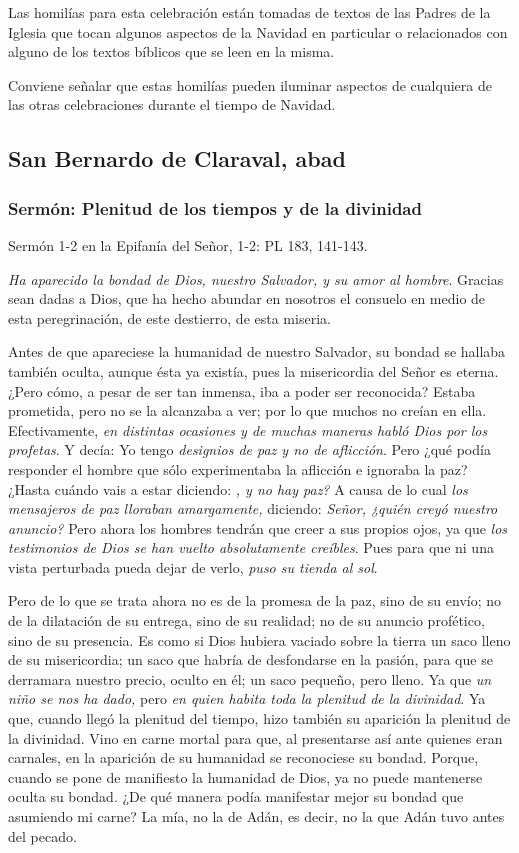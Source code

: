 \begin{body}
\begin{body}
Las homilías para esta celebración están tomadas de textos de las Padres de la Iglesia que tocan algunos aspectos de la Navidad en particular o relacionados con alguno de los textos bíblicos que se leen en la misma.

Conviene señalar que estas homilías pueden iluminar aspectos de cualquiera de las otras celebraciones durante el tiempo de Navidad.

\subsection{San Bernardo de Claraval, abad}

\subsubsection{Sermón: Plenitud de los tiempos y de la divinidad}

Sermón 1-2 en la Epifanía del Señor, 1-2: PL 183, 141-143.

\emph{Ha aparecido la bondad de Dios, nuestro Salvador, y su amor al hombre}. Gracias sean dadas a Dios, que ha hecho abundar en nosotros el consuelo en medio de esta peregrinación, de este destierro, de esta miseria.

Antes de que apareciese la humanidad de nuestro Salvador, su bondad se hallaba también oculta, aunque ésta ya existía, pues la misericordia del Señor es eterna. ¿Pero cómo, a pesar de ser tan inmensa, iba a poder ser reconocida? Estaba prometida, pero no se la alcanzaba a ver; por lo que muchos no creían en ella. Efectivamente, \emph{en distintas ocasiones y de muchas maneras habló Dios por los profetas}. Y decía: Yo tengo \emph{designios de paz y no de aflicción}. Pero ¿qué podía responder el hombre que sólo experimentaba la aflicción e ignoraba la paz? ¿Hasta cuándo vais a estar diciendo: \emph{, y no hay paz?} A causa de lo cual \emph{los mensajeros de paz lloraban amargamente,} diciendo: \emph{Señor, ¿quién creyó nuestro anuncio?} Pero ahora los hombres tendrán que creer a sus propios ojos, ya que \emph{los testimonios de Dios se han vuelto absolutamente creíbles}. Pues para que ni una vista perturbada pueda dejar de verlo, \emph{puso su tienda al sol}.

Pero de lo que se trata ahora no es de la promesa de la paz, sino de su envío; no de la dilatación de su entrega, sino de su realidad; no de su anuncio profético, sino de su presencia. Es como si Dios hubiera vaciado sobre la tierra un saco lleno de su misericordia; un saco que habría de desfondarse en la pasión, para que se derramara nuestro precio, oculto en él; un saco pequeño, pero lleno. Ya que \emph{un niño se nos ha dado,} pero \emph{en quien habita toda la plenitud de la divinidad}. Ya que, cuando llegó la plenitud del tiempo, hizo también su aparición la plenitud de la divinidad. Vino en carne mortal para que, al presentarse así ante quienes eran carnales, en la aparición de su humanidad se reconociese su bondad. Porque, cuando se pone de manifiesto la humanidad de Dios, ya no puede mantenerse oculta su bondad. ¿De qué manera podía manifestar mejor su bondad que asumiendo mi carne? La mía, no la de Adán, es decir, no la que Adán tuvo antes del pecado.


\end{body}
\end{body}
